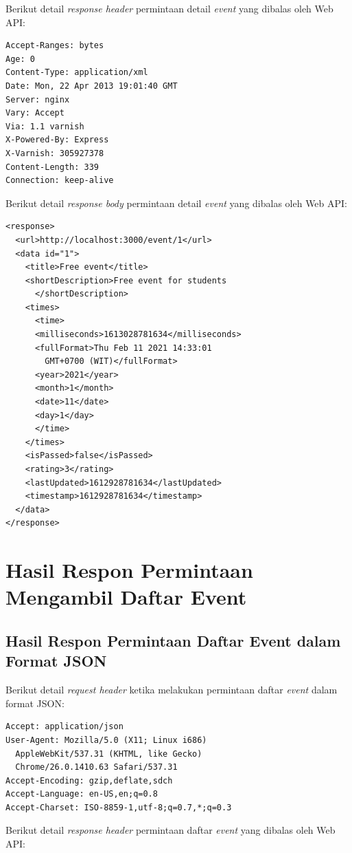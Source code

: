 \documentclass[a4paper, 12pt, oneside]{report}
\begin{document}
Berikut detail \textit{response header} permintaan detail \textit{event} yang dibalas oleh Web API:

\begin{lstlisting}[frame=single]
Accept-Ranges: bytes 
Age: 0 
Content-Type: application/xml
Date: Mon, 22 Apr 2013 19:01:40 GMT 
Server: nginx 
Vary: Accept 
Via: 1.1 varnish 
X-Powered-By: Express
X-Varnish: 305927378
Content-Length: 339 
Connection: keep-alive
\end{lstlisting}

Berikut detail \textit{response body} permintaan detail \textit{event} yang dibalas oleh Web API:

\begin{lstlisting}[frame=single]
<response>
  <url>http://localhost:3000/event/1</url>
  <data id="1">
    <title>Free event</title>
    <shortDescription>Free event for students
      </shortDescription>
    <times>
      <time>
      <milliseconds>1613028781634</milliseconds>
      <fullFormat>Thu Feb 11 2021 14:33:01 
        GMT+0700 (WIT)</fullFormat>
      <year>2021</year>
      <month>1</month>
      <date>11</date>
      <day>1</day>
      </time>
    </times>
    <isPassed>false</isPassed>
    <rating>3</rating>
    <lastUpdated>1612928781634</lastUpdated>
    <timestamp>1612928781634</timestamp>
  </data>
</response>
\end{lstlisting}

\section{Hasil Respon Permintaan Mengambil Daftar Event}

\subsection{Hasil Respon Permintaan Daftar Event dalam Format JSON}

Berikut detail \textit{request header} ketika melakukan permintaan daftar \textit{event} dalam format JSON:

\begin{lstlisting}[frame=single]
Accept: application/json
User-Agent: Mozilla/5.0 (X11; Linux i686)
  AppleWebKit/537.31 (KHTML, like Gecko)
  Chrome/26.0.1410.63 Safari/537.31
Accept-Encoding: gzip,deflate,sdch
Accept-Language: en-US,en;q=0.8
Accept-Charset: ISO-8859-1,utf-8;q=0.7,*;q=0.3
\end{lstlisting}

Berikut detail \textit{response header} permintaan daftar \textit{event} yang dibalas oleh Web API:
\end{document}
